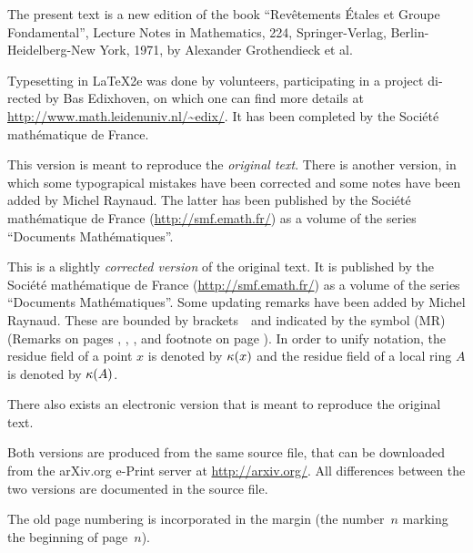 \begin{otherlanguage}{english}
The present text is a new
edition of the book ``Rev\^etements \'Etales et Groupe Fondamental'', Lecture Notes in Mathematics, 224, Springer-Verlag, Berlin-Heidelberg-New York, 1971, by Alexander Grothendieck et al.

Typesetting in \LaTeX 2e was done by volunteers, participating in a project directed by Bas Edixhoven, on which one can find more details at \url{http://www.math.leidenuniv.nl/~edix/}. It has been completed by the Société mathématique de France.

{This version is meant to reproduce the \emph{original text}. There is another version, in which some typograpical mistakes have been corrected and some notes have been added by Michel Raynaud. The latter has been published by the Société mathématique de France (\url{http://smf.emath.fr/}) as a volume of the series ``Documents Mathématiques''.}
{This is a slightly \emph{corrected version} of the original text. It is published by the Société mathématique de France (\url{http://smf.emath.fr/}) as a volume of the series ``Documents Mathématiques''. Some updating remarks have been added by Michel Raynaud. These are bounded by brackets \lcrochetbf\,\rcrochetbf\ and indicated by the symbol (MR) (Remarks on pages \pageref{X.2.14}, \pageref{XI.1.4}, \pageref{XII.5.6}, \pageref{XIII.2.13} and footnote  on page \pageref{III.6.6.p24}). In order to unify notation, the residue field of a point $x$ is denoted by $\kappa(x)$ and the residue field of a local ring $A$ is denoted by $\kappa(A)$.\par
There also exists an electronic version that is meant to reproduce the original text.}

Both versions are produced from the same source file, that can be downloaded from the arXiv.org e-Print server at \url{http://arxiv.org/}. All differences between the two versions are documented in the source file.

The old page numbering is incorporated in the margin (the number~$n$ marking the beginning of page~$n$).
\end{otherlanguage}

\vfill
\cleardoublepage
